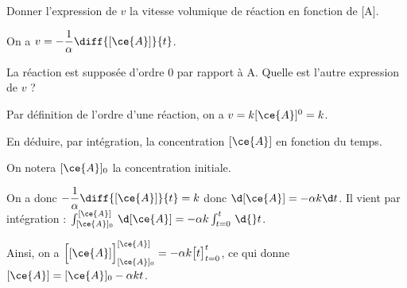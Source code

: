 \debutEntrainement


\begin{enonce}
Donner l'expression de $v$ la vitesse volumique de réaction en fonction de [A].

\end{enonce}


\begin{corrige}
On a $v=-\dfrac{1}{\alpha} \diff{[\ce{A}]}{t}$.
\end{corrige}




\begin{enonce}
La réaction est supposée d'ordre $0$ par rapport à A. 
Quelle est l'autre expression de $v$ ?

\end{enonce}


\begin{corrige}
Par définition de l'ordre d'une réaction, on a $v= k[\ce{A}]^0 = k$.
\end{corrige}




\begin{enonce}
En déduire, par intégration, la concentration $[\ce{A}]$ en fonction du temps. 

On notera $[\ce{A}]_0$ la concentration initiale.

\minusBigskip
\end{enonce}


\begin{corrige}
On a donc $- \dfrac{1}{\alpha} \diff{[\ce{A}]}{t} = k$ donc $\d [\ce{A}] = -\alpha k\d t$. Il vient par intégration : $\int_{[\ce{A}]_0}^{[\ce{A}]} \, \d [\ce{A}] = -\alpha k\int_{t=0}^{t} \, \d{}t$. 

Ainsi, on a 
$\Big[[\ce{A}]\Big]_{[\ce{A}]_0}^{[\ce{A}]} = -\alpha k\big[t\big]_{t=0}^{t}$, ce qui donne $[\ce{A}] = [\ce{A}]_0 - \alpha kt$.
\end{corrige}

